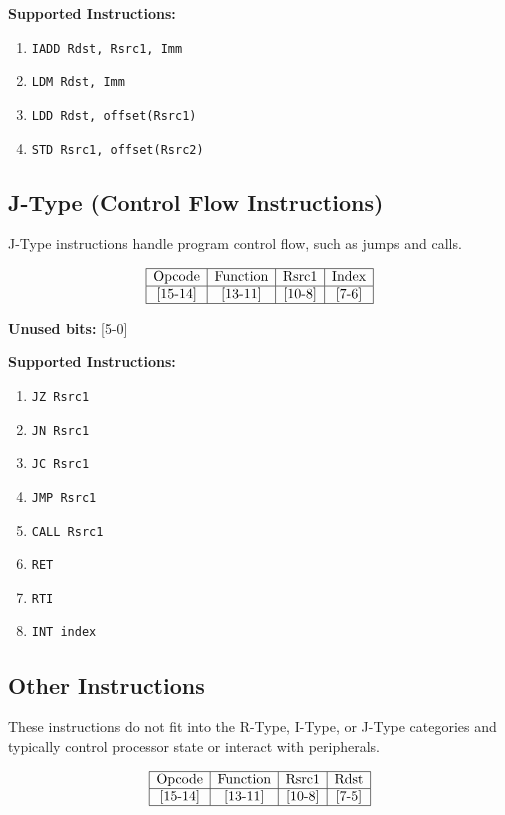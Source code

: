 \documentclass{report}
\begin{document}
\textbf{Supported Instructions:}
\begin{enumerate}
    \item \texttt{IADD Rdst, Rsrc1, Imm}
    \item \texttt{LDM Rdst, Imm}
    \item \texttt{LDD Rdst, offset(Rsrc1)}
    \item \texttt{STD Rsrc1, offset(Rsrc2)}
\end{enumerate}

\subsection*{J-Type (Control Flow Instructions)}
J-Type instructions handle program control flow, such as jumps and calls.

\[
\begin{array}{|c|c|c|c|}
\hline
\text{Opcode} & \text{Function} & \text{Rsrc1} & \text{Index} \\
\hline
\text{[15-14]} & \text{[13-11]} & \text{[10-8]} & \text{[7-6]} \\
\hline
\end{array}
\]

\textbf{Unused bits:} [5-0]

\textbf{Supported Instructions:}
\begin{enumerate}
    \item \texttt{JZ Rsrc1}
    \item \texttt{JN Rsrc1}
    \item \texttt{JC Rsrc1}
    \item \texttt{JMP Rsrc1}
    \item \texttt{CALL Rsrc1}
    \item \texttt{RET}
    \item \texttt{RTI}
    \item \texttt{INT index}
\end{enumerate}

\subsection*{Other Instructions}
These instructions do not fit into the R-Type, I-Type, or J-Type categories and typically control processor state or interact with peripherals.

\[
\begin{array}{|c|c|c|c|}
    \hline
    \text{Opcode} & \text{Function} & \text{Rsrc1} & \text{Rdst} \\
    \hline
    \text{[15-14]} & \text{[13-11]} & \text{[10-8]} & \text{[7-5]} \\
    \hline
\end{array}
\]
\end{document}
